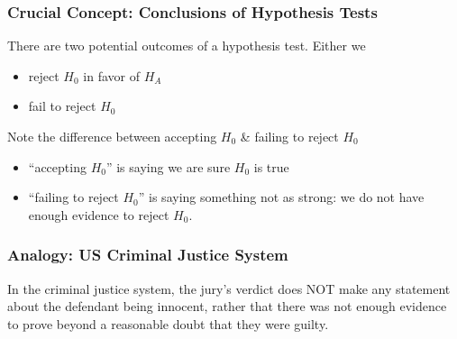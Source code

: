 \documentclass[handout]{beamer}
\newcommand{\blue}[1]{\textcolor{blue2}{#1}}
\begin{document}
\begin{frame}
\frametitle{Crucial Concept: Conclusions of Hypothesis Tests}

%
%
There are two potential outcomes of a hypothesis test.  Either we
\pause \begin{itemize}
\item reject $H_0$ in favor of $H_A$
\item fail to reject $H_0$
\end{itemize}

\vspace{0.5cm}

\pause Note the difference between \blue{accepting $H_0$} \& \blue{failing to reject $H_0$}
\begin{itemize}
\pause \item ``accepting $H_0$'' is saying we are sure $H_0$ is true
\pause \item ``failing to reject $H_0$'' is saying something not as strong:  \blue{we do not have enough evidence to reject $H_0$}.
\end{itemize}

\end{frame}


\begin{frame}
\frametitle{Analogy:  US Criminal Justice System}

In the criminal justice system, the jury's verdict does NOT make any statement about the defendant being \blue{innocent}, rather that there was not enough evidence to prove beyond a reasonable doubt that they were guilty.

\end{frame}
\end{document}
